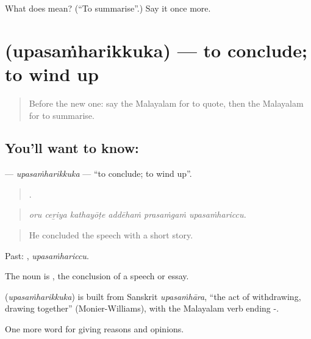 \begin{tcolorbox}[breakable,colback=teal!4,colframe=teal!35!black,title={Before you move on}]
What does  mean? (\textquotedblleft{}To summarise\textquotedblright{}.) Say it once more.
\end{tcolorbox}
\section[\texorpdfstring{\ml{ഉപസംഹരിക്കുക} (upasaṁharikkuka)}{ഉപസംഹരിക്കുക (upasaṁharikkuka)}]{ (upasaṁharikkuka) — to conclude; to wind up}

\label{lesson:ML-C439-upasamharikkuka}



\begin{quote}
Before the new one: say the Malayalam for to quote, then the Malayalam for to summarise.
\end{quote}

\subsection*{You'll want to know: }
\textbf{} — \emph{upasaṁharikkuka} — \textquotedblleft{}to conclude; to wind up\textquotedblright{}.

\begin{quote}
     .
\end{quote}

\begin{quote}
\emph{oru ceṟiya kathayōṭe addēhaṁ prasaṁgaṁ upasaṁhariccu.}
\end{quote}

\begin{quote}
He concluded the speech with a short story.
\end{quote}

Past: , \emph{upasaṁhariccu}.

The noun is , the conclusion of a speech or essay.

\begin{cousinweb}
\textbf{} (\emph{upasaṁharikkuka}) is built from Sanskrit \emph{upasaṁhāra}, \textquotedblleft{}the act of withdrawing, drawing together\textquotedblright{} (Monier-Williams), with the Malayalam verb ending -.
\end{cousinweb}

\begin{grammarlens}[title={What you've built}]
One more word for giving reasons and opinions.
\end{grammarlens}

